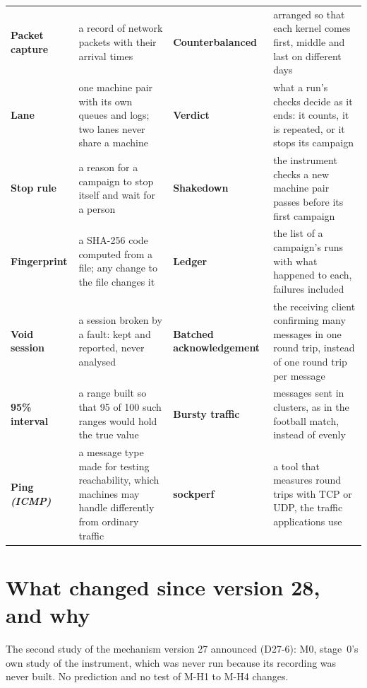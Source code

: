 \documentclass[11pt]{article}
\newcommand{\gl}[1]{{\color{soft}\itshape\small (#1)}}
\begin{document}
{\begin{tabularx}{\linewidth}{@{}>{\bfseries}p{3.1cm} X >{\bfseries}p{3.1cm} X@{}}
Packet capture & a record of network packets with their arrival times & Counterbalanced & arranged so that each kernel comes first, middle and last on different days \\
Lane & one machine pair with its own queues and logs; two lanes never share a machine & Verdict & what a run's checks decide as it ends: it counts, it is repeated, or it stops its campaign \\
Stop rule & a reason for a campaign to stop itself and wait for a person & Shakedown & the instrument checks a new machine pair passes before its first campaign \\
Fingerprint & a SHA-256 code computed from a file; any change to the file changes it & Ledger & the list of a campaign's runs with what happened to each, failures included \\
Void session & a session broken by a fault: kept and reported, never analysed & Batched acknowledgement & the receiving client confirming many messages in one round trip, instead of one round trip per message \\
95\% interval & a range built so that 95 of 100 such ranges would hold the true value & Bursty traffic & messages sent in clusters, as in the football match, instead of evenly \\
Ping \gl{ICMP} & a message type made for testing reachability, which machines may handle differently from ordinary traffic & sockperf & a tool that measures round trips with TCP or UDP, the traffic applications use \\
\end{tabularx}}

\section*{What changed since version 28, and why}
The second study of the mechanism version 27 announced (D27-6): M0, stage~0's own study of the
instrument, which was never run because its recording was never built. No prediction and no
test of M-H1 to M-H4 changes.
\end{document}
